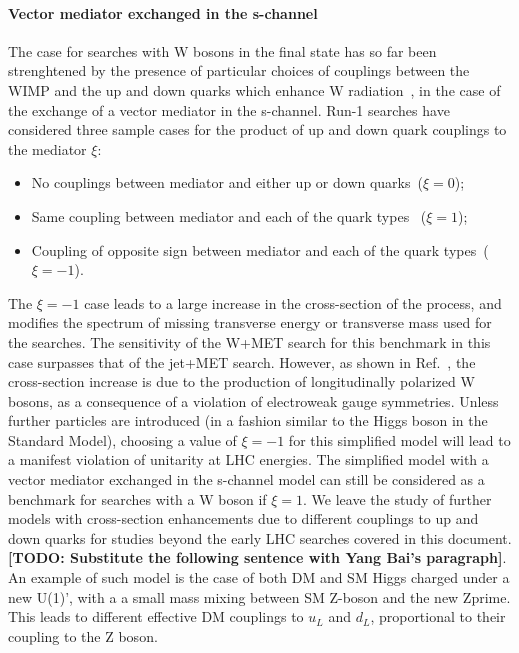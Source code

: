 
\paragraph{Vector mediator exchanged in the s-channel}

The case for searches with W bosons in the final state has so far been strenghtened by the 
presence of particular choices of couplings between the WIMP and the up and 
down quarks which enhance W radiation~\cite{Bai:2012xg}, in the case of the exchange
of a vector mediator in the s-channel. 
Run-1 searches have considered three sample cases for the product of 
up and down quark couplings to the mediator $\xi$:
\begin{itemize}
 \item No couplings between mediator and either up or down quarks~($\xi=0$);
 \item Same coupling between mediator and each of the quark types~ ($\xi=1$);
 \item Coupling of opposite sign between mediator and each of the quark types~($\xi=-1$). 
\end{itemize}
The $\xi=-1$ case leads to a large increase in the cross-section of the process,
and modifies the spectrum of missing transverse energy or 
transverse mass used for the searches. The sensitivity of the W+MET search for 
this benchmark in this case surpasses that of the jet+MET search. 
However, as shown in Ref.~\cite{Bell:2015sza}, the cross-section increase is due
to the production of longitudinally polarized W bosons, 
as a consequence of a violation of electroweak gauge symmetries. Unless further
particles are introduced (in a fashion similar
to the Higgs boson in the Standard Model), choosing a value of $\xi=-1$ 
for this simplified model will lead to a manifest violation of unitarity at LHC energies. 
The simplified model with a vector mediator exchanged in the s-channel model 
can still be considered as a benchmark for searches with a W boson if $\xi=1$. 
We leave the study of further models with cross-section enhancements due
to different couplings to up and down quarks for studies beyond the early LHC searches
covered in this document. 
\textbf{[TODO: Substitute the following sentence with Yang Bai's paragraph]}. 
An example of such model is the case of both DM and SM Higgs charged under a new U(1)',
with a a small mass mixing between SM Z-boson and the new Zprime. This leads
to different effective DM couplings to $u_L$ and $d_L$, proportional to
their coupling to the Z boson. 

